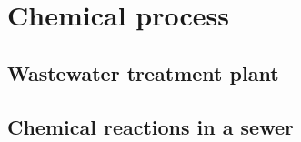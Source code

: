 \section{Chemical process}\label{se:chemical_process}

\subsection{Wastewater treatment plant}\label{subse:Wastewater treatment plant}

\subsection{Chemical reactions in a sewer}\label{subse:chemical_reactions_in_a_sewer}